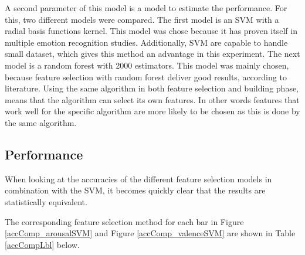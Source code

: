 \npar
A second parameter of this model is a model to estimate the performance. For this, two different models were compared. The first model is an SVM with a radial basis functions kernel. This model was chose because it has proven itself in multiple emotion recognition studies. Additionally, SVM are capable to handle small dataset, which gives this method an advantage in this experiment. The next model is a random forest with 2000 estimators. This model was mainly chosen, because feature selection with random forest deliver good results, according to literature\citep{rfPaper}. Using the same algorithm in both feature selection and building phase, means that the algorithm can select its own features. In other words features that work well for the specific algorithm are more likely to be chosen as this is done by the same algorithm.

\subsection{Performance}

When looking at the accuracies of the different feature selection models in combination with the SVM, it becomes quickly clear that the results are statistically equivalent. 

The corresponding feature selection method for each bar in Figure \ref{accComp_arousalSVM} and Figure \ref{accComp_valenceSVM} are shown in Table \ref{accCompLbl} below.




